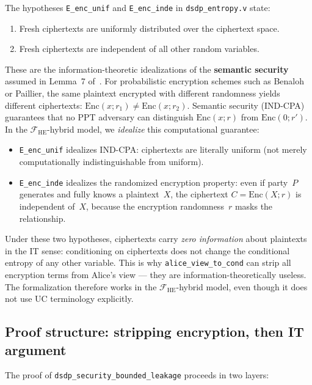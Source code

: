 \documentclass{article}
\begin{document}
The hypotheses \texttt{E\_enc\_unif} and \texttt{E\_enc\_inde} in \texttt{dsdp\_entropy.v} state:
\begin{enumerate}
  \item Fresh ciphertexts are uniformly distributed over the ciphertext space.
  \item Fresh ciphertexts are independent of all other random variables.
\end{enumerate}
These are the information-theoretic idealizations of the \textbf{semantic security} assumed in Lemma~7 of~\cite{dumas2017dual}. For probabilistic encryption schemes such as Benaloh or Paillier, the same plaintext encrypted with different randomness yields different ciphertexts: $\mathrm{Enc}(x; r_1) \neq \mathrm{Enc}(x; r_2)$. Semantic security (IND-CPA) guarantees that no PPT adversary can distinguish $\mathrm{Enc}(x; r)$ from $\mathrm{Enc}(0; r')$. In the $\mathcal{F}_{\mathrm{HE}}$-hybrid model, we \emph{idealize} this computational guarantee:
\begin{itemize}
  \item \texttt{E\_enc\_unif} idealizes IND-CPA: ciphertexts are literally uniform (not merely computationally indistinguishable from uniform).
  \item \texttt{E\_enc\_inde} idealizes the randomized encryption property: even if party~$P$ generates and fully knows a plaintext~$X$, the ciphertext $C = \mathrm{Enc}(X; r)$ is independent of~$X$, because the encryption randomness~$r$ masks the relationship.
\end{itemize}
Under these two hypotheses, ciphertexts carry \emph{zero information} about plaintexts in the IT sense: conditioning on ciphertexts does not change the conditional entropy of any other variable. This is why \texttt{alice\_view\_to\_cond} can strip all encryption terms from Alice's view --- they are information-theoretically useless. The formalization therefore works in the $\mathcal{F}_{\mathrm{HE}}$-hybrid model, even though it does not use UC terminology explicitly.

\subsection*{Proof structure: stripping encryption, then IT argument}

The proof of \texttt{dsdp\_security\_bounded\_leakage} proceeds in two layers:
\end{document}
